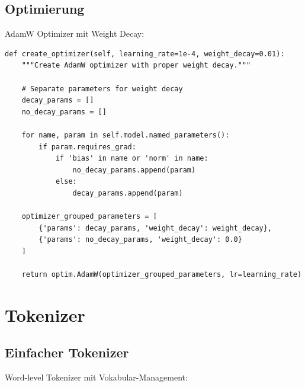 \subsection{Optimierung}

AdamW Optimizer mit Weight Decay:

\begin{lstlisting}[style=pythonstyle, caption=Optimizer Setup]
def create_optimizer(self, learning_rate=1e-4, weight_decay=0.01):
    """Create AdamW optimizer with proper weight decay."""
    
    # Separate parameters for weight decay
    decay_params = []
    no_decay_params = []
    
    for name, param in self.model.named_parameters():
        if param.requires_grad:
            if 'bias' in name or 'norm' in name:
                no_decay_params.append(param)
            else:
                decay_params.append(param)
    
    optimizer_grouped_parameters = [
        {'params': decay_params, 'weight_decay': weight_decay},
        {'params': no_decay_params, 'weight_decay': 0.0}
    ]
    
    return optim.AdamW(optimizer_grouped_parameters, lr=learning_rate)
\end{lstlisting}

\section{Tokenizer}

\subsection{Einfacher Tokenizer}

Word-level Tokenizer mit Vokabular-Management:

